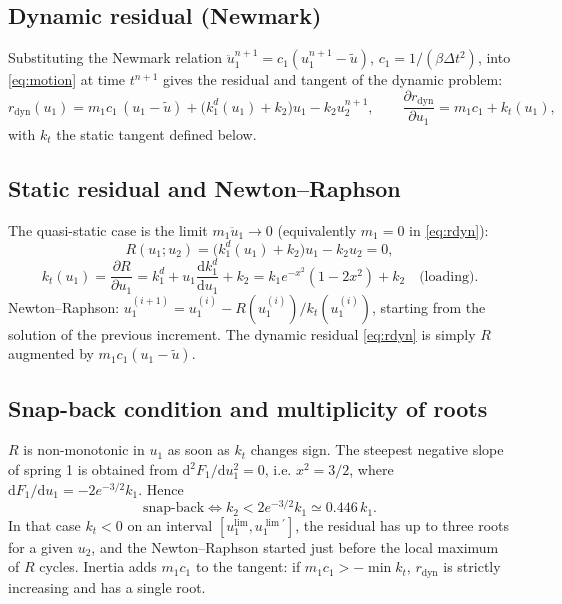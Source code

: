\documentclass[11pt,a4paper]{article}
\newcommand{\dd}{\mathrm{d}}
\newcommand{\kd}{k_1^{d}}
\begin{document}
\subsection{Dynamic residual (Newmark)}
Substituting the Newmark relation $\ddot u_1^{n+1} = c_1(u_1^{n+1}-\tilde u)$,
$c_1 = 1/(\beta\Delta t^2)$, into \eqref{eq:motion} at time $t^{n+1}$ gives the residual
and tangent of the dynamic problem:
\begin{equation}
  r_{\text{dyn}}(u_1) = m_1c_1\,(u_1-\tilde u) + \bigl(\kd(u_1)+k_2\bigr)u_1 - k_2u_2^{n+1},
  \qquad
  \frac{\partial r_{\text{dyn}}}{\partial u_1} = m_1c_1 + k_t(u_1),
  \label{eq:rdyn}
\end{equation}
with $k_t$ the static tangent defined below.

\subsection{Static residual and Newton--Raphson}
The quasi-static case is the limit $m_1\ddot u_1\to0$ (equivalently $m_1 = 0$ in
\eqref{eq:rdyn}):
\begin{equation}
  R(u_1;u_2) = \bigl(\kd(u_1)+k_2\bigr)u_1 - k_2u_2 = 0,
  \label{eq:Rstat}
\end{equation}
\begin{equation}
  k_t(u_1) = \frac{\partial R}{\partial u_1} = \kd + u_1\frac{\dd\kd}{\dd u_1} + k_2
  = k_1e^{-x^2}(1-2x^2) + k_2 \quad\text{(loading)}.
  \label{eq:kt}
\end{equation}
Newton--Raphson: $u_1^{(i+1)} = u_1^{(i)} - R(u_1^{(i)})/k_t(u_1^{(i)})$, starting from the
solution of the previous increment. The dynamic residual \eqref{eq:rdyn} is simply $R$ augmented
by $m_1c_1(u_1-\tilde u)$.

\subsection{Snap-back condition and multiplicity of roots}
$R$ is non-monotonic in $u_1$ as soon as $k_t$ changes sign. The steepest negative slope of
spring 1 is obtained from $\dd^2F_1/\dd u_1^2 = 0$, i.e. $x^2 = 3/2$, where
$\dd F_1/\dd u_1 = -2e^{-3/2}k_1$. Hence
\begin{equation}
  \text{snap-back}\iff k_2 < 2e^{-3/2}k_1 \simeq 0.446\,k_1 .
  \label{eq:snapcond}
\end{equation}
In that case $k_t<0$ on an interval $[u_1^{\lim}, u_1^{\lim\prime}]$, the residual has up to three
roots for a given $u_2$, and the Newton--Raphson started just before the local maximum of $R$
cycles. Inertia adds $m_1c_1$ to the tangent: if $m_1c_1 > -\min k_t$, $r_{\text{dyn}}$ is
strictly increasing and has a single root.
\end{document}
